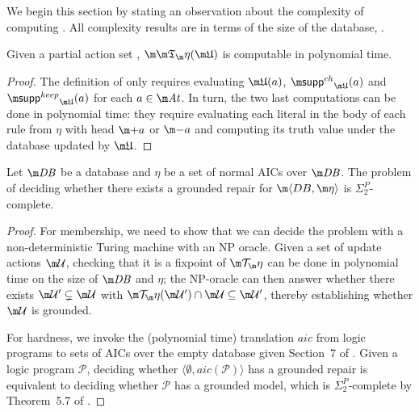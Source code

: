 



We begin this section by stating an observation about the complexity of computing \Ap.
All complexity results are in terms of the size of the database, \fulldb.
\begin{proposition}
  \label{prop:At-poly}
  Given a partial action set \UUU, 
  $\Ap(\UUU)$ is computable in polynomial time. %
\end{proposition}
\begin{proof}
    The definition of \Ap only requires evaluating $\UUU(a)$, $\suppin_{\UUU}(a)$ and $\suppout_{\UUU}(a)$ for each $a\in\atoms$.
    In turn, the two last computations can be done in polynomial time: they require evaluating each literal in the body of each rule from $\eta$ with head $\add a$ or $\remove a$ and computing its truth value under the database updated by $\UUU$.
\end{proof}


\begin{proposition}
  \label{prop:grounded-complexity}
  Let $\db$ be a database and $\eta$ be a set of normal AICs over $\db$.
  The problem of deciding whether there exists a  grounded repair for $\fulldb$ is $\Sigma^P_2$-complete.
\end{proposition}
\begin{proof}
  For membership, we need to show that we can decide the problem with a non-deterministic Turing machine with an NP oracle.
  Given a set of update actions $\UU$, checking that it is a fixpoint of $\Op$ can be done in polynomial time on the size of $\db$ and $\eta$; the NP-oracle can then answer whether there exists $\UU'\subsetneq\UU$ with $\Op(\UU')\cap\UU\subseteq\UU'$, thereby establishing whether $\UU$ is grounded.

  For hardness, we invoke the (polynomial time) translation $\mathit{aic}$ from logic programs to sets of AICs over the empty database given Section~7 of \citet{tplp/CaropreseT11}.
  Given a logic program $\mathcal P$, deciding whether $\langle\emptyset,\mathit{aic}(\mathcal P)\rangle$ has a grounded repair is equivalent to deciding whether $\mathcal P$ has a grounded model, which is $\Sigma^P_2$-complete by Theorem~5.7 of . 
\end{proof}

